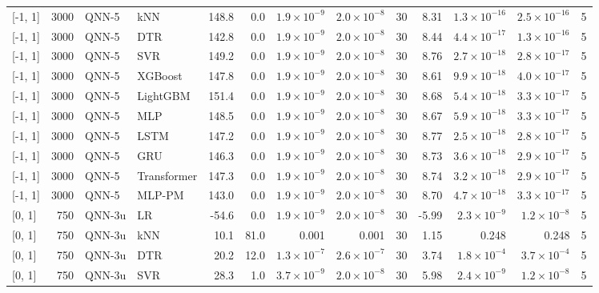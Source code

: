 \begin{longtable}{lrllrrrrrrrrr}
{[-1, 1]} & 3000 & QNN-5 & kNN & 148.8 & 0.0 & $1.9 \times 10^{-9}$ & $2.0 \times 10^{-8}$ & 30 & 8.31 & $1.3 \times 10^{-16}$ & $2.5 \times 10^{-16}$ & 5 \\
{[-1, 1]} & 3000 & QNN-5 & DTR & 142.8 & 0.0 & $1.9 \times 10^{-9}$ & $2.0 \times 10^{-8}$ & 30 & 8.44 & $4.4 \times 10^{-17}$ & $1.3 \times 10^{-16}$ & 5 \\
{[-1, 1]} & 3000 & QNN-5 & SVR & 149.2 & 0.0 & $1.9 \times 10^{-9}$ & $2.0 \times 10^{-8}$ & 30 & 8.76 & $2.7 \times 10^{-18}$ & $2.8 \times 10^{-17}$ & 5 \\
{[-1, 1]} & 3000 & QNN-5 & XGBoost & 147.8 & 0.0 & $1.9 \times 10^{-9}$ & $2.0 \times 10^{-8}$ & 30 & 8.61 & $9.9 \times 10^{-18}$ & $4.0 \times 10^{-17}$ & 5 \\
{[-1, 1]} & 3000 & QNN-5 & LightGBM & 151.4 & 0.0 & $1.9 \times 10^{-9}$ & $2.0 \times 10^{-8}$ & 30 & 8.68 & $5.4 \times 10^{-18}$ & $3.3 \times 10^{-17}$ & 5 \\
{[-1, 1]} & 3000 & QNN-5 & MLP & 148.5 & 0.0 & $1.9 \times 10^{-9}$ & $2.0 \times 10^{-8}$ & 30 & 8.67 & $5.9 \times 10^{-18}$ & $3.3 \times 10^{-17}$ & 5 \\
{[-1, 1]} & 3000 & QNN-5 & LSTM & 147.2 & 0.0 & $1.9 \times 10^{-9}$ & $2.0 \times 10^{-8}$ & 30 & 8.77 & $2.5 \times 10^{-18}$ & $2.8 \times 10^{-17}$ & 5 \\
{[-1, 1]} & 3000 & QNN-5 & GRU & 146.3 & 0.0 & $1.9 \times 10^{-9}$ & $2.0 \times 10^{-8}$ & 30 & 8.73 & $3.6 \times 10^{-18}$ & $2.9 \times 10^{-17}$ & 5 \\
{[-1, 1]} & 3000 & QNN-5 & Transformer & 147.3 & 0.0 & $1.9 \times 10^{-9}$ & $2.0 \times 10^{-8}$ & 30 & 8.74 & $3.2 \times 10^{-18}$ & $2.9 \times 10^{-17}$ & 5 \\
{[-1, 1]} & 3000 & QNN-5 & MLP-PM & 143.0 & 0.0 & $1.9 \times 10^{-9}$ & $2.0 \times 10^{-8}$ & 30 & 8.70 & $4.7 \times 10^{-18}$ & $3.3 \times 10^{-17}$ & 5 \\
\midrule
{[0, 1]} & 750 & QNN-3u & LR & -54.6 & 0.0 & $1.9 \times 10^{-9}$ & $2.0 \times 10^{-8}$ & 30 & -5.99 & $2.3 \times 10^{-9}$ & $1.2 \times 10^{-8}$ & 5 \\
{[0, 1]} & 750 & QNN-3u & kNN & 10.1 & 81.0 & 0.001 & 0.001 & 30 & 1.15 & 0.248 & 0.248 & 5 \\
{[0, 1]} & 750 & QNN-3u & DTR & 20.2 & 12.0 & $1.3 \times 10^{-7}$ & $2.6 \times 10^{-7}$ & 30 & 3.74 & $1.8 \times 10^{-4}$ & $3.7 \times 10^{-4}$ & 5 \\
{[0, 1]} & 750 & QNN-3u & SVR & 28.3 & 1.0 & $3.7 \times 10^{-9}$ & $2.0 \times 10^{-8}$ & 30 & 5.98 & $2.4 \times 10^{-9}$ & $1.2 \times 10^{-8}$ & 5 \\

\end{longtable}
